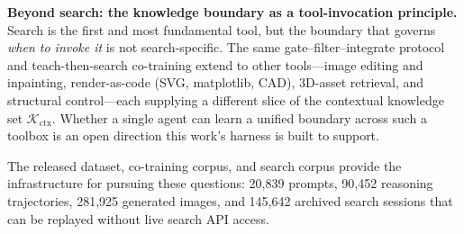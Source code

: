\documentclass{article}
\begin{document}
{\textbf{Beyond search: the knowledge boundary as a tool-invocation principle.} Search is the first and most fundamental tool, but the boundary that governs \emph{when to invoke it} is not search-specific. The same gate--filter--integrate protocol and teach-then-search co-training extend to other tools---image editing and inpainting, render-as-code (SVG, matplotlib, CAD), 3D-asset retrieval, and structural control---each supplying a different slice of the contextual knowledge set $\mathcal{K}_{\mathrm{ctx}}$. Whether a single agent can learn a unified boundary across such a toolbox is an open direction this work's harness is built to support.}

The released dataset, co-training corpus, and search corpus provide the infrastructure for pursuing these questions: 20{,}839 prompts, 90{,}452 reasoning trajectories, 281{,}925 generated images, and 145{,}642 archived search sessions that can be replayed without live search API access.






\clearpage
\appendix


% 
\end{document}
